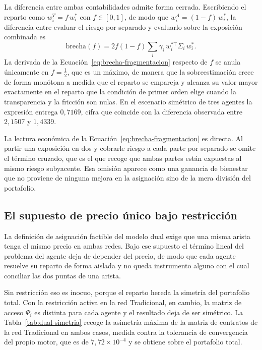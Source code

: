 La diferencia entre ambas contabilidades admite forma cerrada. Escribiendo el
reparto como $w_i^{T} = f\,w_i^{*}$ con $f\in[0,1]$, de modo que
$w_i^{A} = (1-f)\,w_i^{*}$, la diferencia entre evaluar el riesgo por separado y
evaluarlo sobre la exposición combinada es
\begin{equation}
\label{eq:brecha-fragmentacion}
    \text{brecha}(f) = 2f(1-f)\sum_i \gamma_i\, w_i^{*\top}\Sigma_i\, w_i^{*}.
\end{equation}
La derivada de la Ecuación~\eqref{eq:brecha-fragmentacion} respecto de $f$ se
anula únicamente en $f = \tfrac{1}{2}$, que es un máximo, de manera que la
sobreestimación crece de forma monótona a medida que el reparto se empareja y
alcanza su valor mayor exactamente en el reparto que la condición de primer orden
elige cuando la transparencia y la fricción son nulas. En el escenario simétrico
de tres agentes la expresión entrega $0,7169$, cifra que coincide con la
diferencia observada entre $2,1507$ y $1,4339$.

La lectura económica de la Ecuación~\eqref{eq:brecha-fragmentacion} es directa.
Al partir una exposición en dos y cobrarle riesgo a cada parte por separado se
omite el término cruzado, que es el que recoge que ambas partes están expuestas
al mismo riesgo subyacente. Esa omisión aparece como una ganancia de bienestar
que no proviene de ninguna mejora en la asignación sino de la mera división del
portafolio.

\subsection{El supuesto de precio único bajo restricción}
\label{anexo:dual-precio}

La definición de asignación factible del modelo dual exige que una misma arista
tenga el mismo precio en ambas redes. Bajo ese supuesto el término lineal del
problema del agente deja de depender del precio, de modo que cada agente resuelve
su reparto de forma aislada y no queda instrumento alguno con el cual conciliar
las dos puntas de una arista.

Sin restricción eso es inocuo, porque el reparto hereda la simetría del
portafolio total. Con la restricción activa en la red Tradicional, en cambio, la
matriz de acceso $\Psi_i$ es distinta para cada agente y el resultado deja de ser
simétrico. La Tabla~\ref{tab:dual-simetria} recoge la asimetría máxima de la
matriz de contratos de la red Tradicional en ambos casos, medida contra la
tolerancia de convergencia del propio motor, que es de $7{,}72\times10^{-4}$ y se
obtiene sobre el portafolio total.


